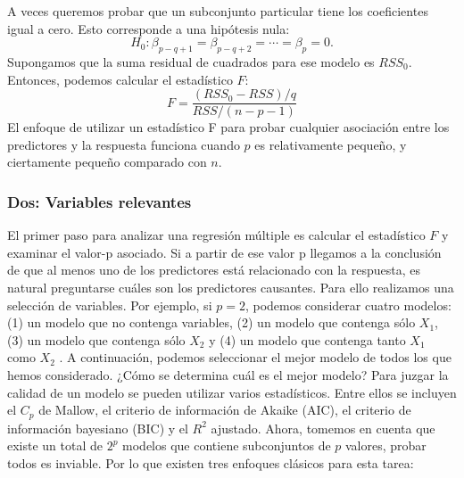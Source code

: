 A veces queremos probar que un subconjunto particular tiene los coeficientes igual a cero. Esto corresponde a una hipótesis nula:
$$H_0:\beta_{p-q+1}=\beta_{p-q+2}=\cdots=\beta_p=0.$$
Supongamos que la suma residual de cuadrados para ese modelo es $RSS_0$. Entonces, podemos calcular el estadístico $F$:
$$F=\dfrac{(RSS_0-RSS)/q}{RSS/(n-p-1)}$$
El enfoque de utilizar un estadístico F para probar cualquier asociación entre los predictores y la respuesta funciona cuando $p$ es relativamente pequeño, y ciertamente pequeño comparado con $n$.

\subsubsection{Dos: Variables relevantes}

El primer paso para analizar una regresión múltiple es calcular el estadístico $F$ y examinar el valor-p asociado. Si a partir de ese valor p llegamos a la conclusión de que al menos uno de los predictores está relacionado con la respuesta, es natural preguntarse cuáles son los predictores causantes. Para ello realizamos una selección de variables. Por ejemplo, si $p=2$, podemos considerar cuatro modelos: (1) un modelo que no contenga variables, (2) un modelo que contenga sólo $X_1$, (3) un modelo que contenga sólo $X_2$ y (4) un modelo que contenga tanto $X_1$ como $X_2$ . A continuación, podemos seleccionar el mejor modelo de todos los que hemos considerado. ¿Cómo se determina cuál es el mejor modelo? Para juzgar la calidad de un modelo se pueden utilizar varios estadísticos. Entre ellos se incluyen el $C_p$ de Mallow, el criterio de información de Akaike (AIC), el criterio de información bayesiano (BIC) y el $R^2$ ajustado. Ahora, tomemos en cuenta que existe un total de $2^p$ modelos que contiene subconjuntos de $p$ valores, probar todos es inviable. Por lo que existen tres enfoques clásicos para esta tarea:

